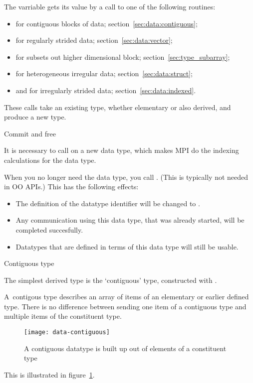The  varriable gets its value by a call to
one of the following routines:
\begin{itemize}
\item {} for contiguous blocks of
  data; section~\ref{sec:data:contiguous};
\item {} for regularly strided data;
  section~\ref{sec:data:vector};
\item {} for subsets out higher
  dimensional block; section~\ref{sec:type_subarray};
\item {} for heterogeneous irregular data;
  section~\ref{sec:data:struct};
\item {} and
   for irregularly strided data;
  section~\ref{sec:data:indexed}.
\end{itemize}
These calls take an existing type, whether elementary or also derived,
and produce a new type.

 {Commit and free}
\label{sec:mpi-type-commit-free}

It is necessary to call  on a new data
type, which makes MPI do the indexing calculations for the data type.

When you no longer
need the data type, you call .
(This is typically not needed in \ac{OO} \acp{API}.)
This has the following effects:
\begin{itemize}
\item The definition of the datatype identifier will be changed to
  .
\item Any communication using this data type, that was already
  started, will be completed succesfully.
\item Datatypes that are defined in terms of this data type will still
  be usable.
\end{itemize}

 {Contiguous type}
\label{sec:data:contiguous}

The simplest derived type is the `contiguous' type,
constructed with .

A~contigous type describes an array of items
of an elementary or earlier defined type. There is no difference between sending
one item of a contiguous type and multiple items of the constituent type.
\begin{figure}[t]
  \texttt{[image: data-contiguous]}
  \caption{A contiguous datatype is built up out of elements of a constituent type}
  \label{fig:data-contiguous}
\end{figure}
This is illustrated in figure~\ref{fig:data-contiguous}.

